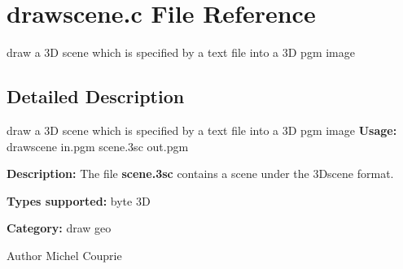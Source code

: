 \section{drawscene.c File Reference}
\label{drawscene_8c}


draw a 3D scene which is specified by a text file into a 3D pgm image  




\subsection{Detailed Description}
draw a 3D scene which is specified by a text file into a 3D pgm image {\bfseries Usage:} drawscene in.pgm scene.3sc out.pgm

{\bfseries Description:} The file {\bfseries scene.3sc} contains a scene under the 3Dscene format.

{\bfseries Types supported:} byte 3D

{\bfseries Category:} draw geo

\begin{DoxyAuthor}{Author}
Michel Couprie 
\end{DoxyAuthor}
